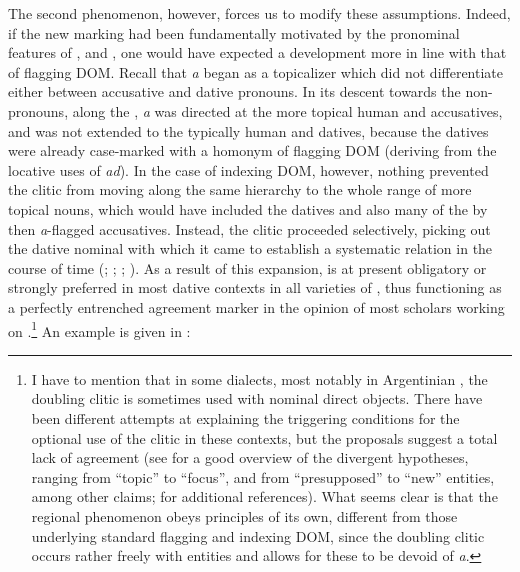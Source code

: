 \documentclass[output=paper]{LSP/langsci}
\begin{document}
 The second phenomenon, however, forces us to modify these assumptions. Indeed, if the new marking had been fundamentally motivated by the pronominal features of ,  and , one would have expected a development more in line with that of flagging DOM. Recall that \textit{a} began as a topicalizer which did not differentiate either between accusative and dative pronouns. In its descent towards the non-pronouns, along the , \textit{a} was directed at the more topical human and  accusatives, and was not extended to the typically human and  datives, because the  datives were already case-marked with a homonym of flagging DOM (deriving from the locative uses of  \textit{ad}). In the case of indexing DOM, however, nothing prevented the clitic from moving along the same hierarchy to the whole range of more topical nouns, which would have included the datives and also many of the by then \textit{a}-flagged accusatives. Instead, the clitic proceeded selectively, picking out the dative nominal with which it came to establish a systematic relation in the course of time (\citealt{Silva-Corvalan1984Semantic}; \citealt{Rini1991Redundant}; \citealt{Melisetal2009Interplay}; \citealt{Rozasetal2012Object}). As a result of this expansion,  is at present obligatory or strongly preferred in most dative contexts in all varieties of  \citep[1250]{FernandezSoriano1999Pronombre}, thus functioning as a perfectly entrenched  agreement marker in the opinion of most scholars working on .\footnote{I have to mention that in some dialects, most notably in Argentinian , the doubling clitic is sometimes used with nominal direct objects. There have been different attempts at explaining the triggering conditions for the optional use of the clitic in these contexts, but the proposals suggest a total lack of agreement (see \citealt{Belloro2007Spanish} for a good overview of the divergent hypotheses, ranging from “topic” to “focus”, and from “presupposed” to “new” entities, among other claims; \cf \citealt{Sanchezetal2013Restricciones} for additional references). What seems clear is that the regional phenomenon obeys principles of its own, different from those underlying standard flagging and indexing DOM, since the doubling clitic occurs rather freely with  entities and allows for these to be devoid of \textit{a}.} An example is given in :
\end{document}
